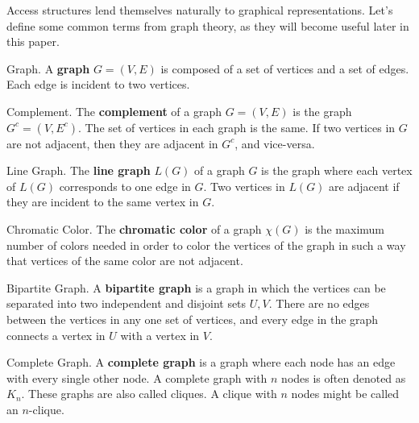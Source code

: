 Access structures lend themselves naturally to graphical representations. Let's define some common terms from graph theory, as they will become useful later in this paper. 

\begin{definition}{Graph.}
    \label{defn:graph}
    A \textbf{graph} $G=(V,E)$ is composed of a set of vertices and a set of edges. Each edge is incident to two vertices.
\end{definition}

\begin{definition}{Complement.}
    \label{defn:complement}
    The \textbf{complement} of a graph $G = (V,E)$ is the graph $G^c = (V,E^c)$. The set of vertices in each graph is the same. If two vertices in $G$ are not adjacent, then they are adjacent in $G^c$, and vice-versa.
\end{definition}

\begin{definition}{Line Graph.}
    \label{defn:line-graph}
    The \textbf{line graph} $L(G)$ of a graph $G$ is the graph where each vertex of $L(G)$ corresponds to one edge in $G$. Two vertices in $L(G)$ are adjacent if they are incident to the same vertex in $G$. 
\end{definition}

\begin{definition}{Chromatic Color.}
    \label{defn:colors}
	The \textbf{chromatic color} of a graph $\chi(G)$ is the maximum number of colors needed in order to color the vertices of the graph in such a way that vertices of the same color are not adjacent.
\end{definition}

\begin{definition}{Bipartite Graph.}
    \label{defn:bipartite}
	A \textbf{bipartite graph} is a graph in which the vertices can be separated into two independent and disjoint sets $U,V$. There are no edges between the vertices in any one set of vertices, and every edge in the graph connects a vertex in $U$ with a vertex in $V$.
\end{definition}

\begin{definition}{Complete Graph.}
    \label{defn:clique}
    A \textbf{complete graph} is a graph where each node has an edge with every single other node. A complete graph with $n$ nodes is often denoted as $K_n$. These graphs are also called cliques. A clique with $n$ nodes might be called an $n$-clique.
\end{definition}


